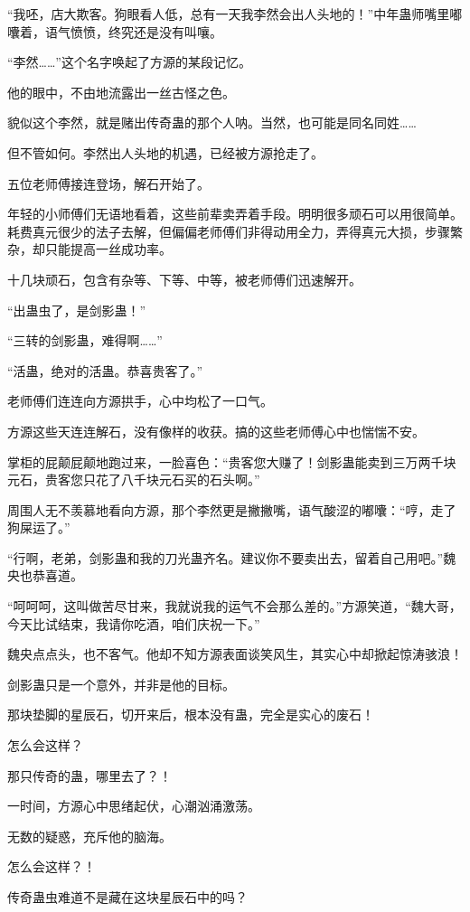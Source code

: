 \begin{this_body}
“我呸，店大欺客。狗眼看人低，总有一天我李然会出人头地的！”中年蛊师嘴里嘟囔着，语气愤愤，终究还是没有叫嚷。

“李然……”这个名字唤起了方源的某段记忆。

他的眼中，不由地流露出一丝古怪之色。

貌似这个李然，就是赌出传奇蛊的那个人呐。当然，也可能是同名同姓……

但不管如何。李然出人头地的机遇，已经被方源抢走了。

五位老师傅接连登场，解石开始了。

年轻的小师傅们无语地看着，这些前辈卖弄着手段。明明很多顽石可以用很简单。耗费真元很少的法子去解，但偏偏老师傅们非得动用全力，弄得真元大损，步骤繁杂，却只能提高一丝成功率。

十几块顽石，包含有杂等、下等、中等，被老师傅们迅速解开。

“出蛊虫了，是剑影蛊！”

“三转的剑影蛊，难得啊……”

“活蛊，绝对的活蛊。恭喜贵客了。”

老师傅们连连向方源拱手，心中均松了一口气。

方源这些天连连解石，没有像样的收获。搞的这些老师傅心中也惴惴不安。

掌柜的屁颠屁颠地跑过来，一脸喜色：“贵客您大赚了！剑影蛊能卖到三万两千块元石，贵客您只花了八千块元石买的石头啊。”

周围人无不羡慕地看向方源，那个李然更是撇撇嘴，语气酸涩的嘟囔：“哼，走了狗屎运了。”

“行啊，老弟，剑影蛊和我的刀光蛊齐名。建议你不要卖出去，留着自己用吧。”魏央也恭喜道。

“呵呵呵，这叫做苦尽甘来，我就说我的运气不会那么差的。”方源笑道，“魏大哥，今天比试结束，我请你吃酒，咱们庆祝一下。”

魏央点点头，也不客气。他却不知方源表面谈笑风生，其实心中却掀起惊涛骇浪！

剑影蛊只是一个意外，并非是他的目标。

那块垫脚的星辰石，切开来后，根本没有蛊，完全是实心的废石！

怎么会这样？

那只传奇的蛊，哪里去了？！

一时间，方源心中思绪起伏，心潮汹涌激荡。

无数的疑惑，充斥他的脑海。

怎么会这样？！

传奇蛊虫难道不是藏在这块星辰石中的吗？


\end{this_body}
